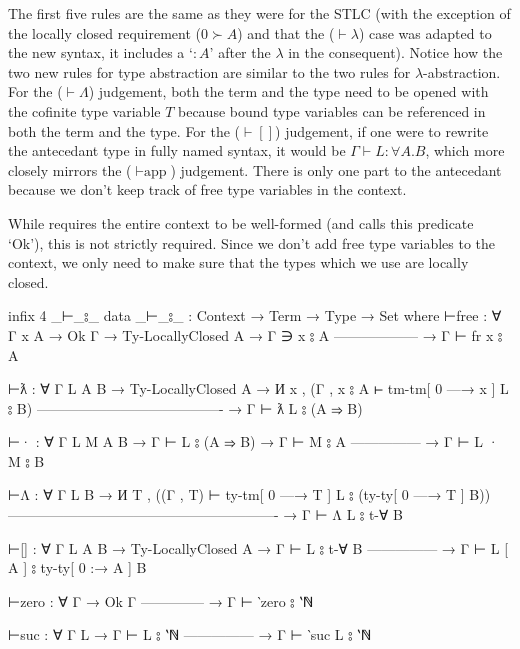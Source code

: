 \documentclass[logo,bsc,singlespacing,parskip,online]{infthesis}
\renewenvironment{code}{\mintedcopy[breaklines,breaksymbolleft=\;]{agda}}{\endmintedcopy}
\begin{document}
The first five rules are the same as they were for the STLC (with the exception of the locally
closed requirement ($0 \succ A$) and that the ($\vdash \lambda$) case was adapted to the new syntax,
it includes a `$\colon A$' after the $\lambda$ in the consequent). Notice how the two new rules for
type abstraction are similar to the two rules for $\lambda$-abstraction. For the ($\vdash\Lambda$)
judgement, both the term and the type need to be opened with the cofinite type variable $T$ because
bound type variables can be referenced in both the term and the type. For the ($\vdash[]$)
judgement, if one were to rewrite the antecedant type in fully named syntax, it would be $\Gamma
\vdash L \colon \forall A. B$, which more closely mirrors the ($\vdash\text{app}$) judgement. There
is only one part to the antecedant because we don't keep track of free type variables in the
context.

While \citet{chargueraud_locally_2012} requires the entire context to be well-formed (and calls this
predicate `Ok'), this is not strictly required. Since we don't add free type variables to the
context, we only need to make sure that the types which we use are locally closed.

\begin{code}
  infix  4 _⊢_⦂_
  data _⊢_⦂_ : Context → Term → Type → Set where
    ⊢free : ∀ {Γ x A}
      → Ok Γ
      → Ty-LocallyClosed A
      → Γ ∋ x ⦂ A
        ------------------
      → Γ ⊢ fr x ⦂ A

    ⊢ƛ : ∀ {Γ L A B}
      → Ty-LocallyClosed A
      → И x , (Γ , x ⦂ A ⊢ tm-tm[ 0 —→ x ] L ⦂ B)
        ----------------------------------------
      → Γ ⊢ ƛ L ⦂ (A ⇒ B)

    ⊢· : ∀ {Γ L M A B}
      → Γ ⊢ L ⦂ (A ⇒ B)
      → Γ ⊢ M ⦂ A
        ---------------
      → Γ ⊢ L · M ⦂ B

    ⊢Λ : ∀ {Γ L B}
      → И T , ((Γ , T) ⊢ ty-tm[ 0 —→ T ] L ⦂ (ty-ty[ 0 —→ T ] B))
        ----------------------------------------------------------
      → Γ ⊢ Λ L ⦂ t-∀ B

    ⊢[] : ∀ {Γ L A B}
      → Ty-LocallyClosed A
      → Γ ⊢ L ⦂ t-∀ B
        ---------------
      → Γ ⊢ L [ A ] ⦂ ty-ty[ 0 :→ A ] B

    ⊢zero : ∀ {Γ}
      → Ok Γ
        --------------
      → Γ ⊢ ‵zero ⦂ ‵ℕ

    ⊢suc : ∀ {Γ L}
      → Γ ⊢ L ⦂ ‵ℕ
        ---------------
      → Γ ⊢ ‵suc L ⦂ ‵ℕ
\end{code}
\end{document}
